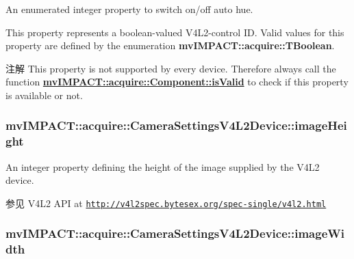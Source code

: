An enumerated integer property to switch on/off auto hue. 

This property represents a boolean-\/valued V4\+L2-\/control I\+D. Valid values for this property are defined by the enumeration {\bfseries mv\+I\+M\+P\+A\+C\+T\+::acquire\+::\+T\+Boolean}.

\begin{DoxyNote}{注解}
This property is not supported by every device. Therefore always call the function {\bfseries \hyperlink{classmv_i_m_p_a_c_t_1_1acquire_1_1_component_ac51e55e7e046101f3c6119d84123abd5}{mv\+I\+M\+P\+A\+C\+T\+::acquire\+::\+Component\+::is\+Valid}} to check if this property is available or not. 
\end{DoxyNote}
\hypertarget{classmv_i_m_p_a_c_t_1_1acquire_1_1_camera_settings_v4_l2_device_a863f0a0d412f2934371d20fe4008f025}{
\subsubsection[{image\+Height}]{ mv\+I\+M\+P\+A\+C\+T\+::acquire\+::\+Camera\+Settings\+V4\+L2\+Device\+::image\+Height}}\label{classmv_i_m_p_a_c_t_1_1acquire_1_1_camera_settings_v4_l2_device_a863f0a0d412f2934371d20fe4008f025}


An integer property defining the height of the image supplied by the V4\+L2 device. 

\begin{DoxySeeAlso}{参见}
V4\+L2 A\+P\+I at \href{http://v4l2spec.bytesex.org/spec-single/v4l2.html}{\tt http\+://v4l2spec.\+bytesex.\+org/spec-\/single/v4l2.\+html} 
\end{DoxySeeAlso}
\hypertarget{classmv_i_m_p_a_c_t_1_1acquire_1_1_camera_settings_v4_l2_device_a27fa220018e3020479e1f376e6f8d881}{
\subsubsection[{image\+Width}]{ mv\+I\+M\+P\+A\+C\+T\+::acquire\+::\+Camera\+Settings\+V4\+L2\+Device\+::image\+Width}}\label{classmv_i_m_p_a_c_t_1_1acquire_1_1_camera_settings_v4_l2_device_a27fa220018e3020479e1f376e6f8d881}


